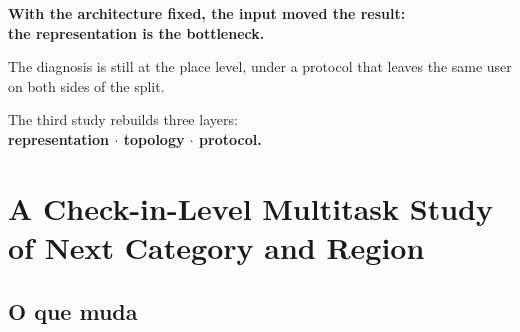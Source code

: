 \documentclass{beamer}
\begin{document}
{
\specialframe
\begin{frame}
    \vfill
    \begin{center}
        {\large\bfseries With the architecture fixed, the input moved the result:\\[1mm]
        the representation is the bottleneck.}

        \bigskip
        {\normalsize The diagnosis is still at the place level, under a protocol that leaves the same user on both sides of the split.}

        \bigskip
        {\large The third study rebuilds three layers:\\[1mm]
        \textbf{representation $\cdot$ topology $\cdot$ protocol.}}
    \end{center}
    \vfill
\end{frame}
}

\section[Check2HGI]{A Check-in-Level Multitask Study of Next Category and Region}


\subsection{O que muda}
\end{document}
